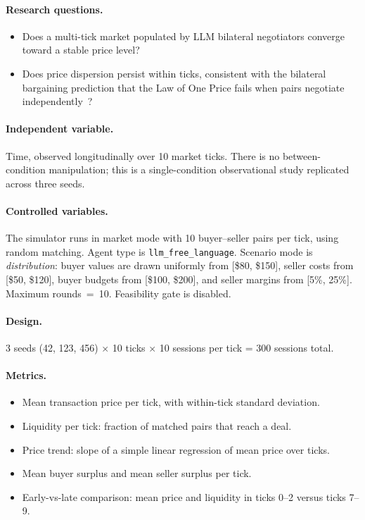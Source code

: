 \paragraph{Research questions.}
\begin{itemize}
    \item[\textbf{RQ-D1.}] Does a multi-tick market populated by LLM bilateral negotiators converge toward a stable price level?
    \item[\textbf{RQ-D2.}] Does price dispersion persist within ticks, consistent with the bilateral bargaining prediction that the Law of One Price fails when pairs negotiate independently~\cite{rubinstein1985}?
\end{itemize}

\paragraph{Independent variable.}
Time, observed longitudinally over 10 market ticks.  There is no between-condition manipulation; this is a single-condition observational study replicated across three seeds.

\paragraph{Controlled variables.}
The simulator runs in market mode with 10 buyer--seller pairs per tick, using random matching.  Agent type is \texttt{llm\_free\_language}.  Scenario mode is \emph{distribution}: buyer values are drawn uniformly from [\$80, \$150], seller costs from [\$50, \$120], buyer budgets from [\$100, \$200], and seller margins from [5\%, 25\%].  Maximum rounds~=~10.  Feasibility gate is disabled.

\paragraph{Design.}
3 seeds (42, 123, 456) $\times$ 10 ticks $\times$ 10 sessions per tick = 300 sessions total.

\paragraph{Metrics.}
\begin{itemize}
    \item Mean transaction price per tick, with within-tick standard deviation.
    \item Liquidity per tick: fraction of matched pairs that reach a deal.
    \item Price trend: slope of a simple linear regression of mean price over ticks.
    \item Mean buyer surplus and mean seller surplus per tick.
    \item Early-vs-late comparison: mean price and liquidity in ticks 0--2 versus ticks 7--9.
\end{itemize}

